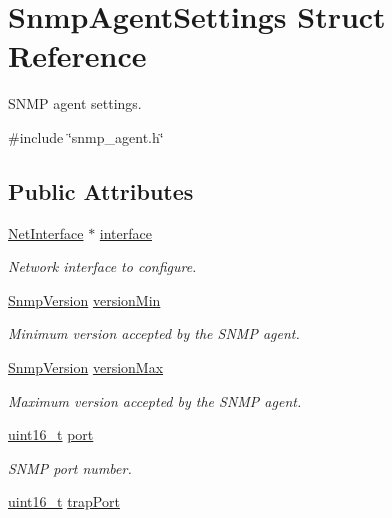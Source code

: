\hypertarget{structSnmpAgentSettings}{}\section{Snmp\+Agent\+Settings Struct Reference}
\label{structSnmpAgentSettings}


S\+N\+MP agent settings.  




{\ttfamily \#include \char`\"{}snmp\+\_\+agent.\+h\char`\"{}}

\subsection*{Public Attributes}
\begin{DoxyCompactItemize}
\item 
\hyperlink{net_8h_a2234db8911a1148c9159979d8f5e0d6b}{Net\+Interface} $\ast$ \hyperlink{structSnmpAgentSettings_ab6c457ae9ee27a3160d9e3d5cb847439}{interface}
\begin{DoxyCompactList}\small\item\em Network interface to configure. \end{DoxyCompactList}\item 
\hyperlink{snmp__common_8h_a80164b0cc3de6c48aad6917f79ee95df}{Snmp\+Version} \hyperlink{structSnmpAgentSettings_aeeffa3bd908a4c92e8380c388c8663c4}{version\+Min}
\begin{DoxyCompactList}\small\item\em Minimum version accepted by the S\+N\+MP agent. \end{DoxyCompactList}\item 
\hyperlink{snmp__common_8h_a80164b0cc3de6c48aad6917f79ee95df}{Snmp\+Version} \hyperlink{structSnmpAgentSettings_a709a4c333b2d522b20c37466b50e3e9a}{version\+Max}
\begin{DoxyCompactList}\small\item\em Maximum version accepted by the S\+N\+MP agent. \end{DoxyCompactList}\item 
\hyperlink{stdint_8h_a273cf69d639a59973b6019625df33e30}{uint16\+\_\+t} \hyperlink{structSnmpAgentSettings_a65d509855573423c26fbdf01cfc5a713}{port}
\begin{DoxyCompactList}\small\item\em S\+N\+MP port number. \end{DoxyCompactList}\item 
\hyperlink{stdint_8h_a273cf69d639a59973b6019625df33e30}{uint16\+\_\+t} \hyperlink{structSnmpAgentSettings_a8e3e0489658544f2f39c4d0cb59d14ae}{trap\+Port}

\end{DoxyCompactItemize}
